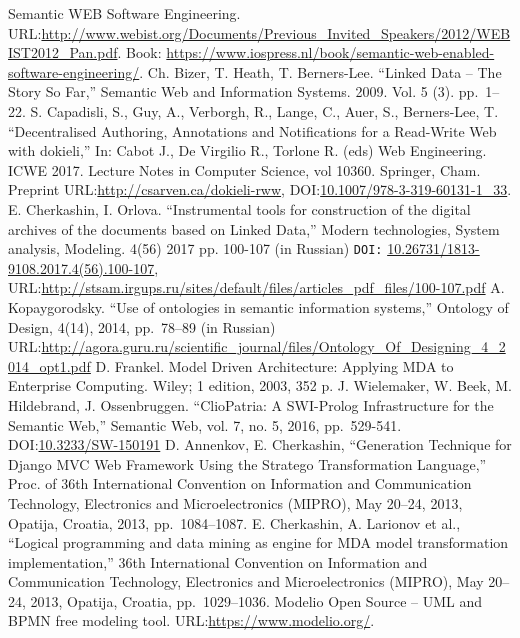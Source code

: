 \documentclass[runningheads]{llncs}
\begin{document}
\begin{thebibliography}{11}
 Semantic WEB Software Engineering. URL:\url{http://www.webist.org/Documents/Previous\_Invited\_Speakers/2012/WEBIST2012\_Pan.pdf}. Book: \url{https://www.iospress.nl/book/semantic-web-enabled-software-engineering/}.
 Ch. Bizer, T. Heath, T. Berners-Lee. ``Linked Data -- The Story So Far,'' Semantic Web and Information Systems. 2009. Vol. 5 (3). pp.~1--22.
 S. Capadisli, S., Guy, A., Verborgh, R., Lange, C., Auer, S., Berners-Lee, T. ``Decentralised Authoring, Annotations and Notifications for a Read-Write Web with dokieli,'' In: Cabot J., De Virgilio R., Torlone R. (eds) Web Engineering. ICWE 2017. Lecture Notes in Computer Science, vol 10360. Springer, Cham. Preprint URL:\url{http://csarven.ca/dokieli-rww}, DOI:\url{10.1007/978-3-319-60131-1_33}.
 E. Cherkashin, I. Orlova. ``Instrumental tools for construction of the digital archives of the documents based on Linked Data,'' Modern technologies, System analysis, Modeling. 4(56) 2017 pp. 100-107 (in Russian) \texttt{DOI:} \url{10.26731/1813-9108.2017.4(56).100-107}, URL:\url{http://stsam.irgups.ru/sites/default/files/articles\_pdf\_files/100-107.pdf}
 A. Kopaygorodsky. ``Use of ontologies in semantic information systems,'' Ontology of Design, 4(14), 2014, pp.~78--89 (in Russian) URL:\href{http://agora.guru.ru/scientific_journal/files/Ontology_Of_Designing_4_2014_opt1.pdf#page=79}{\ttfamily http://agora.guru.ru/scientific\_journal/files/On\-tology\_Of\_Designing\_4\_2014\_opt1.pdf}
 D. Frankel. Model Driven Architecture: Applying MDA to Enterprise Computing. Wiley; 1 edition, 2003, 352 p.
 J. Wielemaker, W. Beek, M. Hildebrand, J. Ossenbruggen. ``ClioPatria: A SWI-Prolog Infrastructure for the Semantic Web,'' Semantic Web, vol. 7, no. 5, 2016, pp.~529-541. DOI:\url{10.3233/SW-150191}
 D. Annenkov, E. Cherkashin, ``Generation Technique for Django MVC Web Framework Using the Stratego Transformation Language,'' Proc. of 36th International Convention on Information and Communication Technology, Electronics and Microelectronics (MIPRO), May 20--24, 2013, Opatija, Croatia, 2013, pp.~1084--1087.
 E. Cherkashin, A. Larionov et al., ``Logical programming and data mining as engine for MDA model transformation implementation,'' 36th International Convention on Information and Communication Technology, Electronics and Microelectronics (MIPRO), May 20--24, 2013, Opatija, Croatia, pp.~1029--1036.
 Modelio Open Source -- UML and BPMN free modeling tool. URL:\url{https://www.modelio.org/}.

\end{thebibliography}
\end{document}
